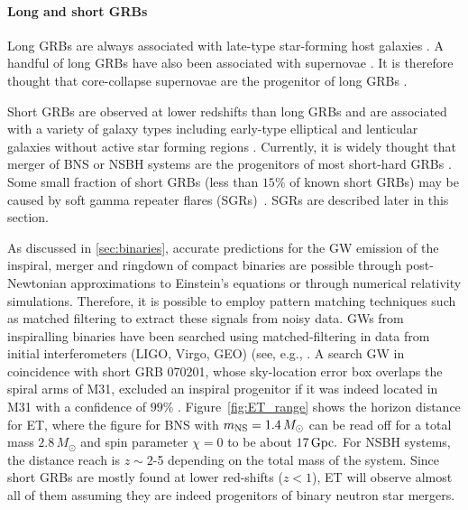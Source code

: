 \paragraph{Long and short GRBs}
Long GRBs are always associated with late-type star-forming host galaxies
\cite{conselice05}.
A handful of long GRBs have also been associated with supernovae
\cite{galama98,kulkarni98,Hjorth2003,Campana:2006qe}.
It is therefore thought that core-collapse supernovae are the progenitor of long
GRBs \cite{woosley93,iwamoto98}.

Short GRBs are observed at lower redshifts than long GRBs and are associated with a
variety of galaxy types including early-type elliptical and lenticular galaxies
without active star forming regions \cite{bloom-2006}.
Currently, it is widely thought that merger of BNS or
NSBH systems are the progenitors of most short-hard GRBs
\cite{bloom07}.
Some small fraction of short GRBs (less than $15\%$ of known short GRBs) may
be caused by soft gamma repeater flares (SGRs)~\cite{2006ApJ...640..849N,Chapman:2009}.
SGRs are described later in this section.

As discussed in \ref{sec:binaries}, accurate predictions for the GW emission of the
inspiral, merger and ringdown of compact binaries are possible through
post-Newtonian approximations to Einstein's equations or through numerical
relativity simulations. Therefore, it is possible to employ pattern matching
techniques such as matched filtering to extract these signals from noisy data.
GWs from inspiralling binaries have been searched using matched-filtering
in data from initial interferometers (LIGO, Virgo, GEO) 
(see, e.g., \cite{Abbott:2003pj,Abbott:2005pe}.  A search GW in coincidence 
with short GRB 070201, whose sky-location error box overlaps the spiral arms 
of M31, excluded an inspiral progenitor if it was indeed located in 
M31 with a confidence of $99\%$ \cite{LSC:GRB070201}.
Figure~\ref{fig:ET_range} shows the horizon distance for
ET, where the figure for BNS with $m_{\rm NS} = 1.4\, M_{\odot}$ 
can be read off for a total mass $2.8\,M_{\odot}$ and spin parameter 
$\chi=0$ to be about $17\,\rm Gpc.$ For NSBH systems, the distance
reach is $z\sim 2$-5 depending on the total mass of the system.
Since short GRBs are mostly found at lower red-shifts ($z<1$), ET 
will observe almost all of them assuming they are indeed progenitors
of binary neutron star mergers.

